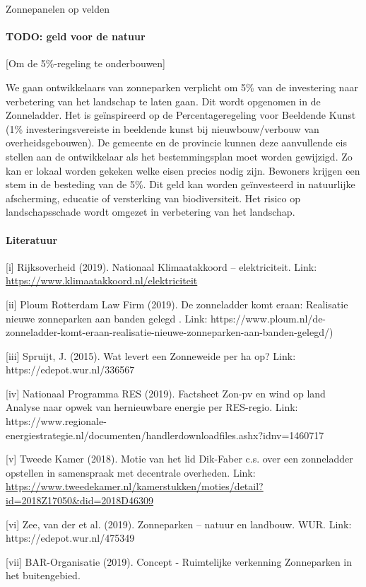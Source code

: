 \begin{voorstel}{Zonnepanelen op velden}
\begin{multicols}{2}
\begin{overwegingen}
\paragraph{TODO: geld voor de natuur}
[Om de 5\%-regeling te onderbouwen]

\end{overwegingen}

\begin{aanbevelingen}
We gaan ontwikkelaars van zonneparken verplicht om 5\% van de investering naar verbetering van het landschap te laten gaan. Dit wordt opgenomen in de Zonneladder. Het is geïnspireerd op de Percentageregeling voor Beeldende Kunst (1\% investeringsvereiste in beeldende kunst bij nieuwbouw/verbouw van overheidsgebouwen). De gemeente en de provincie kunnen deze aanvullende eis stellen aan de ontwikkelaar als het bestemmingsplan moet worden gewijzigd.  Zo kan er lokaal worden gekeken welke eisen precies nodig zijn.  Bewoners krijgen een stem in de besteding van de 5\%.  Dit geld kan worden geïnvesteerd in natuurlijke afscherming, educatie of versterking van biodiversiteit.  Het  risico op landschapsschade wordt omgezet in verbetering van het landschap.
\end{aanbevelingen}


\paragraph{Literatuur}
[i] Rijksoverheid (2019). Nationaal Klimaatakkoord – elektriciteit. Link: \url{https://www.klimaatakkoord.nl/elektriciteit}

[ii] Ploum Rotterdam Law Firm (2019). De zonneladder komt eraan: Realisatie nieuwe zonneparken aan banden gelegd . Link: https://www.ploum.nl/de-zonneladder-komt-eraan-realisatie-nieuwe-zonneparken-aan-banden-gelegd/)

[iii] Spruijt, J. (2015). Wat levert een Zonneweide per ha op? Link: https://edepot.wur.nl/336567

[iv] Nationaal Programma RES (2019). Factsheet Zon-pv en wind op land Analyse naar opwek van hernieuwbare energie per RES-regio. Link: https://www.regionale-energiestrategie.nl/documenten/handlerdownloadfiles.ashx?idnv=1460717

[v] Tweede Kamer (2018). Motie van het lid Dik-Faber c.s. over een zonneladder opstellen in samenspraak met decentrale overheden. Link: \url{https://www.tweedekamer.nl/kamerstukken/moties/detail?id=2018Z17050&did=2018D46309}

[vi] Zee, van der et al. (2019). Zonneparken – natuur en landbouw. WUR. Link: https://edepot.wur.nl/475349

[vii] BAR-Organisatie (2019). Concept - Ruimtelijke verkenning Zonneparken in het buitengebied.

\end{multicols}

\end{voorstel}


